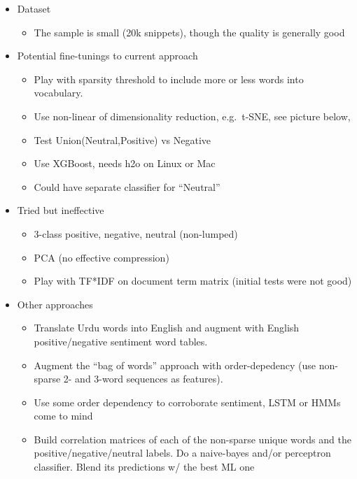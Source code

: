 \documentclass[
]{article}
\providecommand{\tightlist}{%
  \setlength{\itemsep}{0pt}\setlength{\parskip}{0pt}}
\begin{document}
\begin{itemize}
\tightlist
\item
  Dataset

  \begin{itemize}
  \tightlist
  \item
    The sample is small (20k snippets), though the quality is generally
    good
  \end{itemize}
\item
  Potential fine-tunings to current approach

  \begin{itemize}
  \tightlist
  \item
    Play with sparsity threshold to include more or less words into
    vocabulary.
  \item
    Use non-linear of dimensionality reduction, e.g.~t-SNE, see picture
    below,
  \item
    Test Union(Neutral,Positive) vs Negative
  \item
    Use XGBoost, needs h2o on Linux or Mac
  \item
    Could have separate classifier for ``Neutral''
  \end{itemize}
\item
  Tried but ineffective

  \begin{itemize}
  \tightlist
  \item
    3-class positive, negative, neutral (non-lumped)
  \item
    PCA (no effective compression)
  \item
    Play with TF*IDF on document term matrix (initial tests were not
    good)
  \end{itemize}
\item
  Other approaches

  \begin{itemize}
  \tightlist
  \item
    Translate Urdu words into English and augment with English
    positive/negative sentiment word tables.
  \item
    Augment the ``bag of words'' approach with order-depedency (use
    non-sparse 2- and 3-word sequences as features).
  \item
    Use some order dependency to corroborate sentiment, LSTM or HMMs
    come to mind
  \item
    Build correlation matrices of each of the non-sparse unique words
    and the positive/negative/neutral labels. Do a naive-bayes and/or
    perceptron classifier. Blend its predictions w/ the best ML one
  \end{itemize}
\end{itemize}
\end{document}
